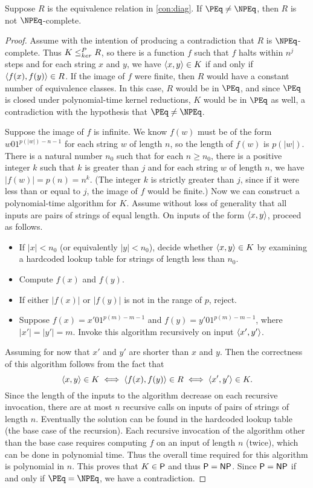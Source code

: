 \begin{lemma}
  Suppose $R$ is the equivalence relation in \autoref{con:diag}.
  If $\PEq \neq \NPEq$, then $R$ is not $\NPEq$-complete.
\end{lemma}
\begin{proof}
  Assume with the intention of producing a contradiction that $R$ is $\NPEq$-complete.
  Thus $K \kr R$, so there is a function $f$ such that $f$ halts within $n^j$ steps and for each string $x$ and $y$, we have $\pair{x}{y} \in K$ if and only if $\pair{f(x)}{f(y)} \in R$.
  If the image of $f$ were finite, then $R$ would have a constant number of equivalence classes.
  In this case, $R$ would be in $\PEq$, and since $\PEq$ is closed under polynomial-time kernel reductions, $K$ would be in $\PEq$ as well, a contradiction with the hypothesis that $\PEq \neq \NPEq$.

  Suppose the image of $f$ is infinite.
  We know $f(w)$ must be of the form $w01^{p(|w|) - n - 1}$ for each string $w$ of length $n$, so the length of $f(w)$ is $p(|w|)$.
  There is a natural number $n_0$ such that for each $n \geq n_0$, there is a positive integer $k$ such that $k$ is greater than $j$ and for each string $w$ of length $n$, we have $|f(w)| = p(n) = n^k$.
  (The integer $k$ is strictly greater than $j$, since if it were less than or equal to $j$, the image of $f$ would be finite.)
  Now we can construct a polynomial-time algorithm for $K$.
  Assume without loss of generality that all inputs are pairs of strings of equal length.
  On inputs of the form $\pair{x}{y}$, proceed as follows.
  \begin{itemize}
  \item If $|x| < n_0$ (or equivalently $|y| < n_0$), decide whether $\pair{x}{y} \in K$ by examining a hardcoded lookup table for strings of length less than $n_0$.
  \item Compute $f(x)$ and $f(y)$.
  \item If either $|f(x)|$ or $|f(y)|$ is not in the range of $p$, reject.
  \item
    Suppose $f(x) = x' 0 1^{p(m) - m - 1}$ and $f(y) = y' 0 1^{p(m) - m - 1}$, where $|x'| = |y'| = m$.
    Invoke this algorithm recursively on input $\pair{x'}{y'}$.
  \end{itemize}

  Assuming for now that $x'$ and $y'$ are shorter than $x$ and $y$.
  Then the correctness of this algorithm follows from the fact that
  \begin{equation*}
    \pair{x}{y} \in K \iff \pair{f(x)}{f(y)} \in R \iff \pair{x'}{y'} \in K.
  \end{equation*}
  Since the length of the inputs to the algorithm decrease on each recursive invocation, there are at most $n$ recursive calls on inputs of pairs of strings of length $n$.
  Eventually the solution can be found in the hardcoded lookup table (the base case of the recursion).
  Each recursive invocation of the algorithm other than the base case requires computing $f$ on an input of length $n$ (twice), which can be done in polynomial time.
  Thus the overall time required for this algorithm is polynomial in $n$.
  This proves that $K \in \P$ and thus $\P = \NP$.
  Since $\P = \NP$ if and only if $\PEq = \NPEq$, we have a contradiction.


\end{proof}
